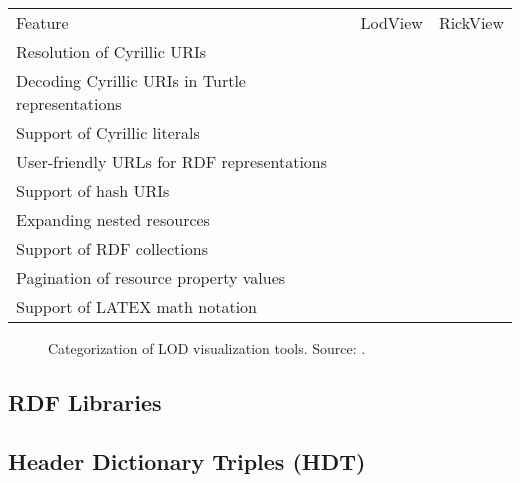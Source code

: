 \documentclass{ceurart}
\begin{document}
\begin{tabular}{lll}
\toprule
Feature												&LodView	&RickView\\
Resolution of Cyrillic URIs							&\\
Decoding Cyrillic URIs in Turtle representations	&\\
Support of Cyrillic literals						&\\
User-friendly URLs for RDF representations			&&\\
Support of hash URIs			&&\\
Expanding nested resources			&&\\
Support of RDF collections			&&\\
Pagination of resource property values			&&\\
Support of LATEX math notation			&&\\
\midrule
\bottomrule
\end{tabular}



\begin{figure}
\centering
\caption{Categorization of LOD visualization tools. Source: \cite{adaptinglodview}.}
\label{fig:relatedwork}
\end{figure}


\subsection{RDF Libraries}

\subsection{Header Dictionary Triples (HDT)}

\end{document}
